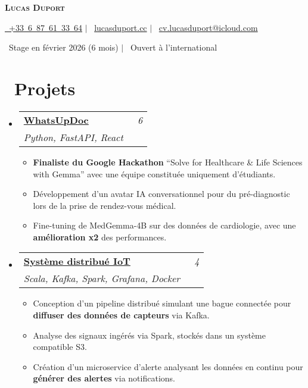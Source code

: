 \documentclass[letterpaper,11pt]{article}
\makeatletter
\newcommand{\resumeItem}[1]{
  \item\small{{#1 \vspace{-2pt}}}
}
\newcommand{\resumeSubheading}[4]{
  \vspace{-2pt}\item
  \begin{tabular*}{0.97\textwidth}[t]{@{}l@{\extracolsep{\fill}}r@{}}
    \textbf{#1} & \textit{\small #2} \\
    \textit{\small#3} & \textit{\small #4} \\
  \end{tabular*}\vspace{-7pt}
}
\newcommand{\resumeSubHeadingListStart}{\begin{itemize}[leftmargin=0.15in, label={}]}
\newcommand{\resumeSubHeadingListEnd}{\end{itemize}}
\newcommand{\resumeItemListStart}{\begin{itemize}}
\newcommand{\resumeItemListEnd}{\end{itemize}\vspace{-5pt}}
\makeatother
\begin{document}
\begin{center}
  \textbf{\Huge \scshape Lucas Duport}
\end{center}

\begin{center}
  \small \href{tel:+33687613364}{\faPhone\ +33~6~87~61~33~64} $|$
  \faLink\ \href{https://lucasduport.cc}{lucasduport.cc} $|$
  \faEnvelope\ \href{mailto:cv.lucasduport@icloud.com}
  {cv.lucasduport@icloud.com} 
\end{center}

\begin{center}
  \small \faCalendar\ Stage en février 2026 (6 mois) $|$
  \faGlobe\ Ouvert à l’international
\end{center}


\section*{\small \faProjectDiagram\ \large Projets}
\resumeSubHeadingListStart

    \resumeSubheading
    {\href{https://github.com/orgs/WhatsUpDoc-Google-Hackathon/repositories}{WhatsUpDoc}}{\small \faGroup\ \normalsize 6}
    {Python, FastAPI, React}{}
    {}
    \resumeItemListStart
      \resumeItem{\textbf{Finaliste du Google Hackathon} “Solve for Healthcare \& Life Sciences with Gemma” avec une équipe constituée uniquement d'étudiants.}
      \resumeItem{Développement d’un avatar IA conversationnel pour du pré-diagnostic lors de la prise de rendez-vous médical.}
      \resumeItem{Fine-tuning de MedGemma-4B sur des données de cardiologie, avec une \textbf{amélioration x2} des performances.}
    \resumeItemListEnd

    \resumeSubheading
    {\href{https://github.com/lucasduport/iot-ring-monitoring}{Système distribué IoT}}{\small \faGroup\ \normalsize 4}
  {Scala, Kafka, Spark, Grafana, Docker}{}
  {}
  \resumeItemListStart
    \resumeItem{Conception d’un pipeline distribué simulant une bague connectée pour \textbf{diffuser des données de capteurs} via Kafka.}
    \resumeItem{Analyse des signaux ingérés via Spark, stockés dans un système compatible S3.}
    \resumeItem{Création d’un microservice d’alerte analysant les données en continu pour \textbf{générer des alertes} via notifications.}
  \resumeItemListEnd

\resumeSubHeadingListEnd

\end{document}
